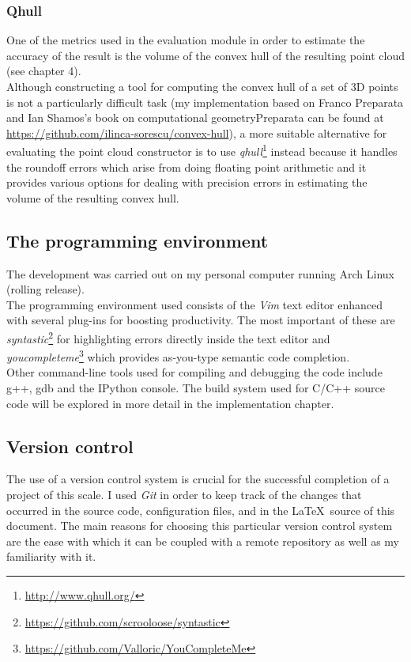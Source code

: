 \documentclass[12pt,a4paper,twoside,openright]{report}
\begin{document}
\subsubsection{Qhull}
One of the metrics used in the evaluation module in order to estimate the accuracy of the result is the volume of the convex hull of the resulting point cloud (see chapter 4).\\
Although constructing a tool for computing the convex hull of a set of 3D points is not a particularly difficult task (my implementation based on Franco Preparata and Ian Shamos's book on computational geometry{Preparata} can be found at \url{https://github.com/ilinca-sorescu/convex-hull}), a more suitable alternative for evaluating the point cloud constructor is to use \emph{qhull}\footnote{\url{http://www.qhull.org/}} instead because it handles the roundoff errors which arise from doing floating point arithmetic and it provides various options for dealing with precision errors in estimating the volume of the resulting convex hull. 

\subsection{The programming environment}
The development was carried out on my personal computer running Arch Linux (rolling release).\\
The programming environment used consists of the \textit{Vim} text editor enhanced with several plug-ins for boosting productivity. The most important of these are \textit{syntastic}\footnote{\url{https://github.com/scrooloose/syntastic}} for highlighting errors directly inside the text editor and \textit{youcompleteme}\footnote{\url{https://github.com/Valloric/YouCompleteMe}} which provides as-you-type semantic code completion.\\
Other command-line tools used for compiling and debugging the code include g++, gdb and the IPython console. The build system used for C/C++ source code will be explored in more detail in the implementation chapter.

\subsection{Version control}
The use of a version control system is crucial for the successful completion of a project of this scale. I used \emph{Git} in order to keep track of the changes that occurred in the source code, configuration files, and in the \LaTeX\  source of this document. The main reasons for choosing this particular version control system are the ease with which it can be coupled with a remote repository as well as my familiarity with it.
\end{document}
